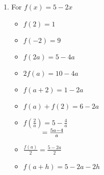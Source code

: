 \begin{enumerate}
\begin{multicols}{3}
\begin{itemize}
\item $\frac{f(a)}{2} =\frac{2a-5}{2}$

\vfill

\columnbreak


\item  $f(a + h) = 2a + 2h - 5$

\end{itemize}
\end{multicols}

\item For $f(x) = 5-2x$

\begin{multicols}{3}
\begin{itemize}

\item  $f(2) = 1$
\item  $f(-2) = 9$
\item  $f(2a) = 5-4a$

\end{itemize}
\end{multicols}

\begin{multicols}{3}
\begin{itemize}

\item  $2 f(a) = 10-4a$
\item $f(a+2) = 1-2a$
\item $f(a) + f(2) = 6-2a$

\end{itemize}
\end{multicols}

\begin{multicols}{3}
\begin{itemize}

\item  $f \left( \frac{2}{a} \right) = 5 - \frac{4}{a}$ \\
$\hphantom{f \left( \frac{2}{a} \right)} = \frac{5a-4}{a}$

\vfill

\columnbreak

\item $\frac{f(a)}{2} = \frac{5-2a}{2}$

\vfill

\columnbreak


\item  $f(a + h) = 5-2a-2h$

\end{itemize}
\end{multicols}



\end{enumerate}

